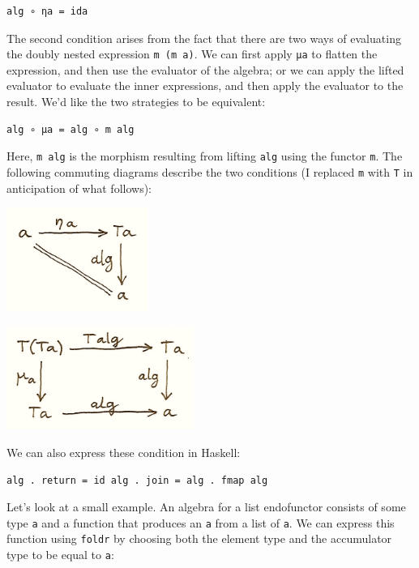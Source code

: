 \begin{verbatim}
alg ∘ ηa = ida
\end{verbatim}

The second condition arises from the fact that there are two ways of
evaluating the doubly nested expression \texttt{m\ (m\ a)}. We can first
apply \texttt{μa} to flatten the expression, and then use the evaluator
of the algebra; or we can apply the lifted evaluator to evaluate the
inner expressions, and then apply the evaluator to the result. We'd like
the two strategies to be equivalent:

\begin{verbatim}
alg ∘ μa = alg ∘ m alg
\end{verbatim}

Here, \texttt{m\ alg} is the morphism resulting from lifting
\texttt{alg} using the functor \texttt{m}. The following commuting
diagrams describe the two conditions (I replaced \texttt{m} with
\texttt{T} in anticipation of what follows):

\includegraphics[width=1.81250in]{images/talg1.png}

\includegraphics[width=2.40625in]{images/talg2.png}

We can also express these condition in Haskell:

\begin{verbatim}
alg . return = id alg . join = alg . fmap alg
\end{verbatim}

Let's look at a small example. An algebra for a list endofunctor
consists of some type \texttt{a} and a function that produces an
\texttt{a} from a list of \texttt{a}. We can express this function using
\texttt{foldr} by choosing both the element type and the accumulator
type to be equal to \texttt{a}:

